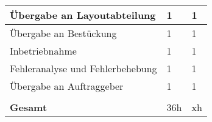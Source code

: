 \begin{tabularx}{\textwidth}{p{}|  p{} | p{}}
Übergabe an Layoutabteilung						&	1	&	1\\

\hline

Übergabe an Bestückung							&	1	&	1\\

\hline

Inbetriebnahme									&	1	&	1\\

\hline

Fehleranalyse und Fehlerbehebung				&	1	&	1\\

\hline 

Übergabe an Auftraggeber						&	1	&	1\\

&&\\

\textbf{Gesamt}	&	36h		&	xh

\end{tabularx}
\renewcommand{\arraystretch}{1}